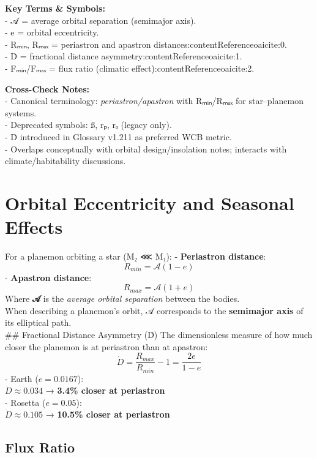 \documentclass[
  letterpaper,
]{book}
\begin{document}
\textbf{Key Terms \& Symbols:}\\
- 𝒜 = average orbital separation (semimajor axis).\\
- e = orbital eccentricity.\\
- Rₘᵢₙ, Rₘₐₓ = periastron and apastron
distances:contentReference{oaicite:0}.\\
- Ḋ = fractional distance asymmetry:contentReference{oaicite:1}.\\
- Fₘᵢₙ/Fₘₐₓ = flux ratio (climatic effect):contentReference{oaicite:2}.

\textbf{Cross-Check Notes:}\\
- Canonical terminology: \emph{periastron/apastron} with Rₘᵢₙ/Rₘₐₓ for
star--planemon systems.\\
- Deprecated symbols: ß, rₚ, rₐ (legacy only).\\
- Ḋ introduced in Glossary v1.211 as preferred WCB metric.\\
- Overlaps conceptually with orbital design/insolation notes; interacts
with climate/habitability discussions.

\chapter{Orbital Eccentricity and Seasonal
Effects}\label{orbital-eccentricity-and-seasonal-effects}

For a planemon orbiting a star (M₂ ⋘ M₁): - \textbf{Periastron
distance}:\\
\[
 R_{min} = \mathcal{A}(1 - e)
\] - \textbf{Apastron distance}:\\
\[
 R_{max} = \mathcal{A}(1 + e)
\] Where \textbf{𝒜} is the \emph{average orbital separation} between the
bodies.\\
When describing a planemon's orbit, 𝒜 corresponds to the
\textbf{semimajor axis} of its elliptical path.\\
\#\# Fractional Distance Asymmetry (Ḋ) The dimensionless measure of how
much closer the planemon is at periastron than at apastron: \[
\dot{D} = \frac{R_{max}}{R_{min}} - 1 = \frac{2e}{1-e}
\] - Earth (\(e = 0.0167\)):\\
\(\dot{D} \approx 0.034\) → \textbf{3.4\% closer at periastron}\\
- Rosetta (\(e = 0.05\)):\\
\(\dot{D} \approx 0.105\) → \textbf{10.5\% closer at periastron}

\section{Flux Ratio}\label{flux-ratio}
\end{document}
